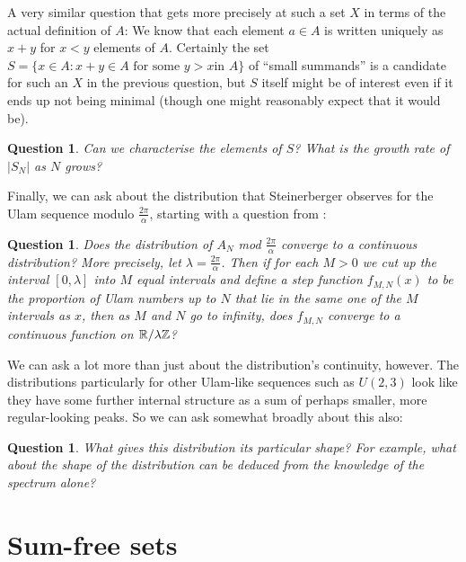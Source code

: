 \documentclass{report}
\newtheorem{question}[theorem]{Question}
\theoremstyle{remark}
\numberwithin{equation}{section}
\begin{document}
A very similar question that gets more precisely at such a set $X$ in
terms of the actual definition of $A$: We know that each element
$a \in A$ is written uniquely as $x+y$ for $x < y$ elements of $A$.
Certainly the set $S = \{x \in A : x + y \in A\text{ for some $y > x$
  in $A$}\}$ of ``small summands'' is a candidate for such an $X$ in
the previous question, but $S$ itself might be of interest even if it
ends up not being minimal (though one might reasonably expect that it
would be).

\begin{question}\label{qn:fulcrum}
  Can we characterise the elements of $S$?  What is the growth rate of
  $|S_N|$ as $N$ grows?
\end{question}

Finally, we can ask about the distribution that Steinerberger observes
for the Ulam sequence modulo $\frac{2\pi}{\alpha}$, starting with a
question from \cite{steinerberger:preprint}: 

\begin{question}\label{qn:continuity}
  Does the distribution of $A_N$ mod $\frac{2\pi}{\alpha}$ converge to
  a continuous distribution?  More precisely, let
  $\lambda = \frac{2\pi}{\alpha}$.  Then if for each $M > 0$ we cut up
  the interval $[0,\lambda]$ into $M$ equal intervals and define a
  step function $f_{M,N}(x)$ to be the proportion of Ulam numbers up
  to $N$ that lie in the same one of the $M$ intervals as $x$, then as
  $M$ and $N$ go to infinity, does $f_{M,N}$ converge to a continuous
  function on $\mathbb{R}/\lambda\mathbb{Z}$?
\end{question}

We can ask a lot more than just about the distribution's continuity,
however.  The distributions particularly for other Ulam-like sequences
such as $U(2,3)$ look like they have some further internal structure
as a sum of perhaps smaller, more regular-looking peaks.  So we can
ask somewhat broadly about this also: 

\begin{question}\label{qn:shape}
  What gives this distribution its particular shape?  For example,
  what about the shape of the distribution can be deduced from the
  knowledge of the spectrum alone?
\end{question}

\section{Sum-free sets}
\end{document}
